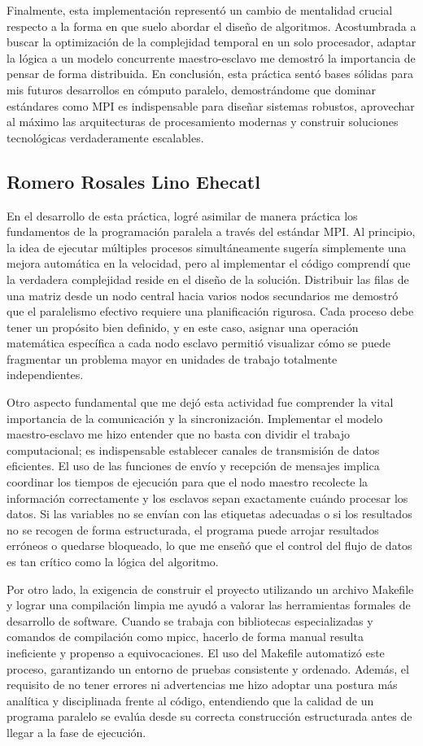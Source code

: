 Finalmente, esta implementación representó un cambio de mentalidad crucial respecto a la forma en que suelo abordar el diseño de algoritmos. Acostumbrada a buscar la optimización de la complejidad temporal en un solo procesador, adaptar la lógica a un modelo concurrente maestro-esclavo me demostró la importancia de pensar de forma distribuida. En conclusión, esta práctica sentó bases sólidas para mis futuros desarrollos en cómputo paralelo, demostrándome que dominar estándares como MPI es indispensable para diseñar sistemas robustos, aprovechar al máximo las arquitecturas de procesamiento modernas y construir soluciones tecnológicas verdaderamente escalables.
\clearpage
\subsection{Romero Rosales Lino Ehecatl}
En el desarrollo de esta práctica, logré asimilar de manera práctica los fundamentos de la programación paralela a través del estándar MPI. Al principio, la idea de ejecutar múltiples procesos simultáneamente sugería simplemente una mejora automática en la velocidad, pero al implementar el código comprendí que la verdadera complejidad reside en el diseño de la solución. Distribuir las filas de una matriz desde un nodo central hacia varios nodos secundarios me demostró que el paralelismo efectivo requiere una planificación rigurosa. Cada proceso debe tener un propósito bien definido, y en este caso, asignar una operación matemática específica a cada nodo esclavo permitió visualizar cómo se puede fragmentar un problema mayor en unidades de trabajo totalmente independientes.

Otro aspecto fundamental que me dejó esta actividad fue comprender la vital importancia de la comunicación y la sincronización. Implementar el modelo maestro-esclavo me hizo entender que no basta con dividir el trabajo computacional; es indispensable establecer canales de transmisión de datos eficientes. El uso de las funciones de envío y recepción de mensajes implica coordinar los tiempos de ejecución para que el nodo maestro recolecte la información correctamente y los esclavos sepan exactamente cuándo procesar los datos. Si las variables no se envían con las etiquetas adecuadas o si los resultados no se recogen de forma estructurada, el programa puede arrojar resultados erróneos o quedarse bloqueado, lo que me enseñó que el control del flujo de datos es tan crítico como la lógica del algoritmo.

Por otro lado, la exigencia de construir el proyecto utilizando un archivo Makefile y lograr una compilación limpia me ayudó a valorar las herramientas formales de desarrollo de software. Cuando se trabaja con bibliotecas especializadas y comandos de compilación como mpicc, hacerlo de forma manual resulta ineficiente y propenso a equivocaciones. El uso del Makefile automatizó este proceso, garantizando un entorno de pruebas consistente y ordenado. Además, el requisito de no tener errores ni advertencias me hizo adoptar una postura más analítica y disciplinada frente al código, entendiendo que la calidad de un programa paralelo se evalúa desde su correcta construcción estructurada antes de llegar a la fase de ejecución.

